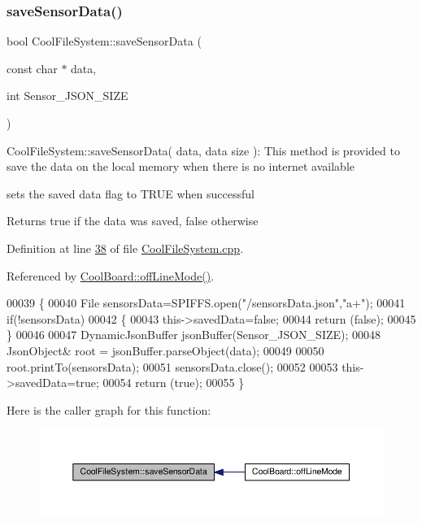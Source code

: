 \subsubsection{\texorpdfstring{save\+Sensor\+Data()}{saveSensorData()}}
{\footnotesize\ttfamily bool Cool\+File\+System\+::save\+Sensor\+Data (\begin{DoxyParamCaption}\item[{const char $\ast$}]{data,  }\item[{int}]{Sensor\+\_\+\+J\+S\+O\+N\+\_\+\+S\+I\+ZE }\end{DoxyParamCaption})}

Cool\+File\+System\+::save\+Sensor\+Data( data, data size )\+: This method is provided to save the data on the local memory when there is no internet available

sets the saved data flag to T\+R\+UE when successful

\begin{DoxyReturn}{Returns}
true if the data was saved, false otherwise 
\end{DoxyReturn}


Definition at line \hyperlink{_cool_file_system_8cpp_source_l00038}{38} of file \hyperlink{_cool_file_system_8cpp_source}{Cool\+File\+System.\+cpp}.



Referenced by \hyperlink{_cool_board_8cpp_source_l00187}{Cool\+Board\+::off\+Line\+Mode()}.


\begin{DoxyCode}
00039 \{
00040     File sensorsData=SPIFFS.open(\textcolor{stringliteral}{"/sensorsData.json"},\textcolor{stringliteral}{"a+"});
00041     \textcolor{keywordflow}{if}(!sensorsData)
00042     \{
00043         this->savedData=\textcolor{keyword}{false};
00044         \textcolor{keywordflow}{return} (\textcolor{keyword}{false}); 
00045     \}   
00046 
00047     DynamicJsonBuffer jsonBuffer(Sensor\_JSON\_SIZE);
00048     JsonObject& root = jsonBuffer.parseObject(data);
00049     
00050     root.printTo(sensorsData);
00051     sensorsData.close();
00052     
00053     this->savedData=\textcolor{keyword}{true};
00054     \textcolor{keywordflow}{return} (\textcolor{keyword}{true});      
00055 \}
\end{DoxyCode}
Here is the caller graph for this function\+:
\nopagebreak
\begin{figure}[H]
\begin{center}
\leavevmode
\includegraphics[width=350pt]{class_cool_file_system_a4c560c2ddd40b74b7758e6ceb2c58957_icgraph}
\end{center}
\end{figure}
\mbox{\label{class_cool_file_system_a32dad79ae80182a83e2e8f52286b7c7b}} 
